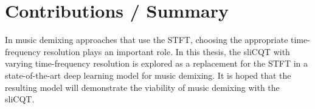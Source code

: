 \documentclass[letter,12pt]{article}
\begin{document}
\section{Contributions / Summary}

In music demixing approaches that use the STFT, choosing the appropriate time-frequency resolution plays an important role. In this thesis, the sliCQT with varying time-frequency resolution is explored as a replacement for the STFT in a state-of-the-art deep learning model for music demixing. It is hoped that the resulting model will demonstrate the viability of music demixing with the sliCQT.

\vfill
\clearpage %


\begingroup
{}
\setlength\bibitemsep{0.05em}
\printbibheading[title={References},heading=bibnumbered]
\printbibliography[heading=none]
\endgroup

\vfill
\clearpage %
\end{document}
